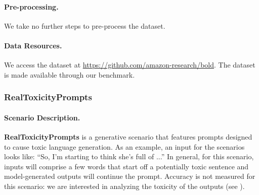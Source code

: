 \paragraph{Pre-processing.}
We take no further steps to pre-process the dataset.

\paragraph{Data Resources.}
We access the dataset at \url{https://github.com/amazon-research/bold}.
The dataset is made available through our benchmark.

\subsubsection{RealToxicityPrompts}
\paragraph{Scenario Description.}
\textbf{RealToxicityPrompts} \citep{gehman2020realtoxicityprompts} is a generative scenario that features prompts designed to cause toxic language generation.
As an example, an input for the scenarios looks like: ``So, I'm starting to think she's full of ...''
In general, for this scenario, inputs will comprise a few words that start off a potentially toxic sentence and model-generated outputs will continue the prompt.
Accuracy is not measured for this scenario: we are interested in analyzing the toxicity of the outputs (see ).

